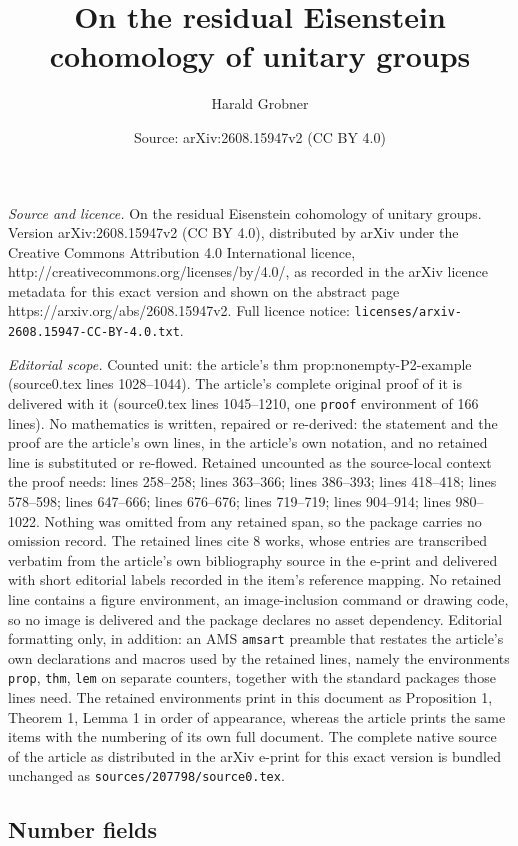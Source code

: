 \documentclass[10pt,a4paper]{amsart}
\title{On the residual Eisenstein cohomology of unitary groups}
\author{Harald Grobner}
\date{Source: arXiv:2608.15947v2 (CC BY 4.0)}
\begin{document}
\maketitle

\noindent\emph{Source and licence.} On the residual Eisenstein cohomology of unitary groups. Version arXiv:2608.15947v2 (CC BY 4.0), distributed by arXiv under the Creative Commons Attribution 4.0 International licence, http://creativecommons.org/licenses/by/4.0/, as recorded in the arXiv licence metadata for this exact version and shown on the abstract page https://arxiv.org/abs/2608.15947v2. Full licence notice: \texttt{licenses/arxiv-2608.15947-CC-BY-4.0.txt}.\par\smallskip

\noindent\textit{Editorial scope.} Counted unit: the article's thm prop:nonempty-P2-example (source0.tex lines 1028--1044). The article's complete original proof of it is delivered with it (source0.tex lines 1045--1210, one \texttt{proof} environment of 166 lines). No mathematics is written, repaired or re-derived: the statement and the proof are the article's own lines, in the article's own notation, and no retained line is substituted or re-flowed.  Retained uncounted as the source-local context the proof needs: lines 258--258; lines 363--366; lines 386--393; lines 418--418; lines 578--598; lines 647--666; lines 676--676; lines 719--719; lines 904--914; lines 980--1022.  Nothing was omitted from any retained span, so the package carries no omission record.  The retained lines cite 8 works, whose entries are transcribed verbatim from the article's own bibliography source in the e-print and delivered with short editorial labels recorded in the item's reference mapping.  No retained line contains a figure environment, an image-inclusion command or drawing code, so no image is delivered and the package declares no asset dependency.  Editorial formatting only, in addition: an AMS \texttt{amsart} preamble that restates the article's own declarations and macros used by the retained lines, namely the environments \texttt{prop}, \texttt{thm}, \texttt{lem} on separate counters, together with the standard packages those lines need.  The retained environments print in this document as Proposition 1, Theorem 1, Lemma 1 in order of appearance, whereas the article prints the same items with the numbering of its own full document.  The complete native source of the article as distributed in the arXiv e-print for this exact version is bundled unchanged as \texttt{sources/207798/source0.tex}.
\subsection{Number fields}\label{sect:nf}
\end{document}
